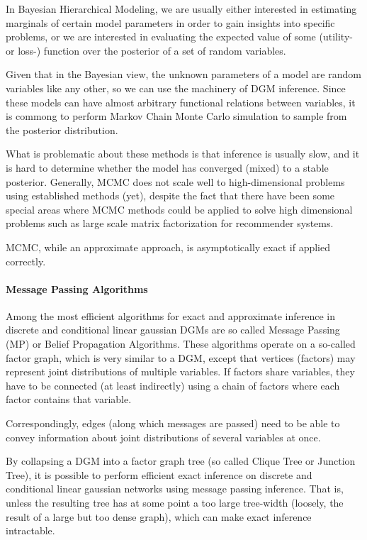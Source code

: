 \documentclass[letterpaper,10pt,english]{/home/londenberg/python-env/clean/lib/python2.7/site-packages/sphinx/texinputs/sphinxhowto}
\begin{document}
In Bayesian Hierarchical Modeling, we are usually either interested in
estimating marginals of certain model parameters in order to gain
insights into specific problems, or we are interested in evaluating the
expected value of some (utility- or loss-) function over the posterior
of a set of random variables.

Given that in the Bayesian view, the unknown parameters of a model are
random variables like any other, so we can use the machinery of DGM
inference. Since these models can have almost arbitrary functional
relations between variables, it is commong to perform Markov Chain Monte
Carlo simulation to sample from the posterior distribution.

What is problematic about these methods is that inference is usually
slow, and it is hard to determine whether the model has converged
(mixed) to a stable posterior. Generally, MCMC does not scale well to
high-dimensional problems using established methods (yet), despite the
fact that there have been some special areas where MCMC methods could be
applied to solve high dimensional problems such as large scale matrix
factorization for recommender systems.

MCMC, while an approximate approach, is asymptotically exact if applied
correctly.\paragraph{Message Passing Algorithms}

Among the most efficient algorithms for exact and approximate inference
in discrete and conditional linear gaussian DGMs are so called Message
Passing (MP) or Belief Propagation Algorithms. These algorithms operate
on a so-called factor graph, which is very similar to a DGM, except that
vertices (factors) may represent joint distributions of multiple
variables. If factors share variables, they have to be connected (at
least indirectly) using a chain of factors where each factor contains
that variable.

Correspondingly, edges (along which messages are passed) need to be able
to convey information about joint distributions of several variables at
once.

By collapsing a DGM into a factor graph tree (so called Clique Tree or
Junction Tree), it is possible to perform efficient exact inference on
discrete and conditional linear gaussian networks using message passing
inference. That is, unless the resulting tree has at some point a too
large tree-width (loosely, the result of a large but too dense graph),
which can make exact inference intractable.
\end{document}
